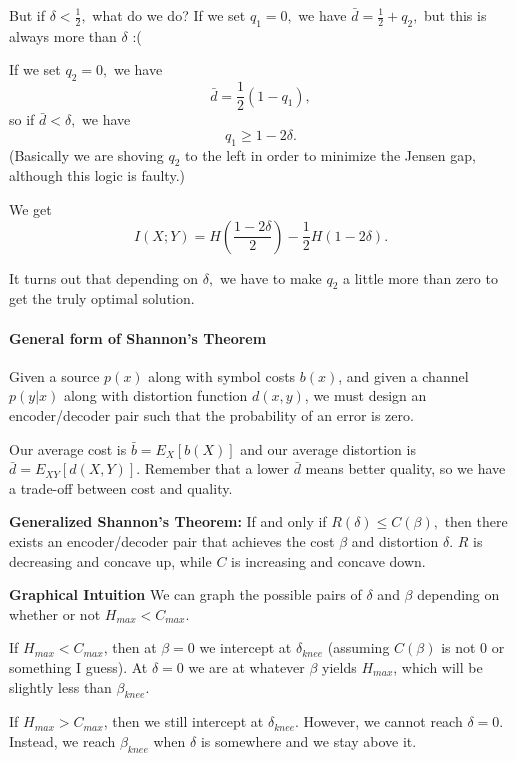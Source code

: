 \documentclass[12pt]{article}
\theoremstyle{remark}
\begin{document}
But if $\delta<\frac{1}{2},$ what do we do? If we set $q_1=0,$ we have $\bar{d}=\frac{1}{2}+q_2,$ but this is always more than $\delta$ :(

If we set $q_2=0,$ we have \[\bar{d}=\frac{1}{2}(1-q_1),\] so if $\bar{d}<\delta,$ we have
\[q_1\ge 1-2\delta.\] (Basically we are shoving $q_2$ to the left in order to minimize the Jensen gap, although this logic is faulty.)

We get
\[I(X;Y)=H\left(\frac{1-2\delta}{2}\right)-\frac{1}{2}H(1-2\delta).\]

It turns out that depending on $\delta,$ we have to make $q_2$ a little more than zero to get the truly optimal solution.

\paragraph{General form of Shannon's Theorem}
Given a source $p(x)$ along with symbol costs $b(x)$, and given a channel $p(y|x)$ along with distortion function $d(x,y)$, we must design an encoder/decoder pair such that the probability of an error is zero.

Our average cost is $\bar{b}=E_X[b(X)]$ and our average distortion is $\bar{d}=E_{XY}[d(X,Y)].$ Remember that a lower $\bar{d}$ means better quality, so we have a trade-off between cost and quality.

\textbf{Generalized Shannon's Theorem:} If and only if $R(\delta)\le C(\beta),$ then there exists an encoder/decoder pair that achieves the cost $\beta$ and distortion $\delta.$ $R$ is decreasing and concave up, while $C$ is increasing and concave down.

\textbf{Graphical Intuition}
We can graph the possible pairs of $\delta$ and $\beta$ depending on whether or not $H_{max}<C_{max}$.

If $H_{max} < C_{max}$, then at $\beta = 0$ we intercept at $\delta_{knee}$ (assuming $C(\beta)$ is not 0 or something I guess). At $\delta = 0$ we are at whatever $\beta$ yields $H_{max}$, which will be slightly less than $\beta_{knee}$.

If $H_{max} > C_{max}$, then we still intercept at $\delta_{knee}$. However, we cannot reach $\delta = 0$. Instead, we reach $\beta_{knee}$ when $\delta$ is somewhere and we stay above it.
\end{document}
